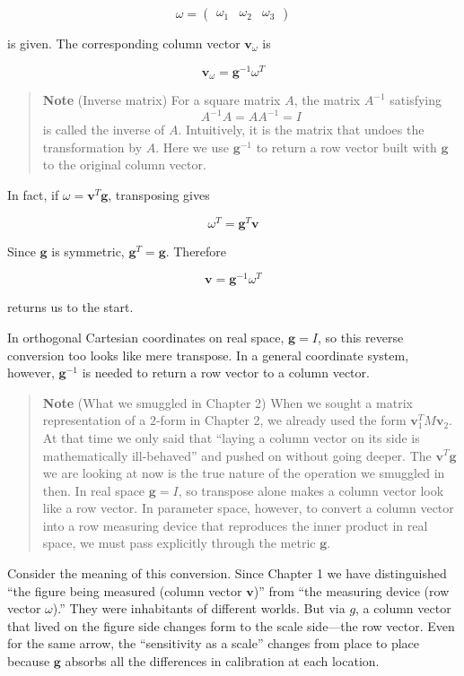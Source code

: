 \[
\omega =
\begin{pmatrix}
\omega_1 & \omega_2 & \omega_3
\end{pmatrix}
\]

is given. The corresponding column vector \(\mathbf{v}_\omega\) is

\[
\mathbf{v}_\omega = \mathbf{g}^{-1}\omega^T
\]

\begin{quote}
\textbf{Note} (Inverse matrix) For a square matrix \(A\), the matrix
\(A^{-1}\) satisfying \[
A^{-1}A = AA^{-1} = I
\] is called the inverse of \(A\). Intuitively, it is the matrix that
undoes the transformation by \(A\). Here we use \(\mathbf{g}^{-1}\) to
return a row vector built with \(\mathbf{g}\) to the original column
vector.
\end{quote}

In fact, if \(\omega = \mathbf{v}^T\mathbf{g}\), transposing gives

\[
\omega^T = \mathbf{g}^T\mathbf{v}
\]

Since \(\mathbf{g}\) is symmetric, \(\mathbf{g}^T = \mathbf{g}\).
Therefore

\[
\mathbf{v} = \mathbf{g}^{-1}\omega^T
\]

returns us to the start.

In orthogonal Cartesian coordinates on real space, \(\mathbf{g}=I\), so
this reverse conversion too looks like mere transpose. In a general
coordinate system, however, \(\mathbf{g}^{-1}\) is needed to return a
row vector to a column vector.

\begin{quote}
\textbf{Note} (What we smuggled in Chapter 2) When we sought a matrix
representation of a \(2\)-form in Chapter 2, we already used the form
\(\mathbf{v}_1^T M \mathbf{v}_2\). At that time we only said that
``laying a column vector on its side is mathematically ill-behaved'' and
pushed on without going deeper. The \(\mathbf{v}^T\mathbf{g}\) we are
looking at now is the true nature of the operation we smuggled in then.
In real space \(\mathbf{g}=I\), so transpose alone makes a column vector
look like a row vector. In parameter space, however, to convert a column
vector into a row measuring device that reproduces the inner product in
real space, we must pass explicitly through the metric \(\mathbf{g}\).
\end{quote}

Consider the meaning of this conversion. Since Chapter 1 we have
distinguished ``the figure being measured (column vector
\(\mathbf{v}\))'' from ``the measuring device (row vector \(\omega\)).''
They were inhabitants of different worlds. But via \(g\), a column
vector that lived on the figure side changes form to the scale
side---the row vector. Even for the same arrow, the ``sensitivity as a
scale'' changes from place to place because \(\mathbf{g}\) absorbs all
the differences in calibration at each location.

